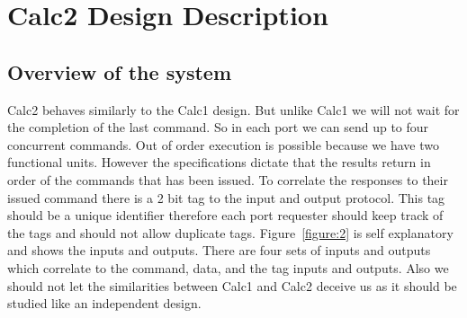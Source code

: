 \documentclass[a4paper, 11pt]{article}
\begin{document}
\section{Calc2 Design Description}

\subsection{Overview of the system}
Calc2 behaves similarly to the Calc1 design. But unlike Calc1 we will not wait
for the completion of the last command. So in each port we can send up to four
concurrent commands. Out of order execution is possible because we have two
functional units. However the specifications dictate that the results return in
order of the commands that has been issued. To correlate the responses to their
issued command there is a 2 bit tag to the input and output protocol. This tag
should be a unique identifier therefore each port requester should keep track
of the tags and should not allow duplicate tags. Figure~\ref{figure:2} is self
explanatory and shows the inputs and outputs. There are four sets of inputs and
outputs which correlate to the command, data, and the tag inputs and outputs.
Also we should not let the similarities between Calc1
and Calc2 deceive us as it should be studied like an independent design.
\end{document}
